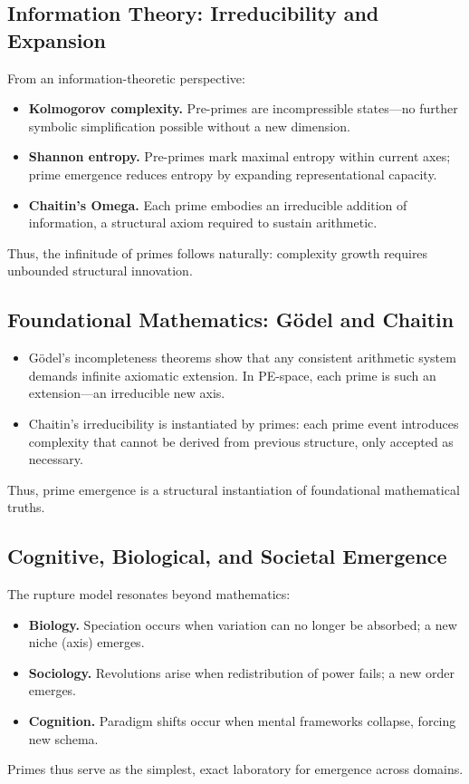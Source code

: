 \documentclass[11pt]{article}
\theoremstyle{plain}
\theoremstyle{definition}
\begin{document}
\subsection{Information Theory: Irreducibility and Expansion}
From an information-theoretic perspective:
\begin{itemize}
  \item \textbf{Kolmogorov complexity.} Pre-primes are incompressible states—no further symbolic simplification possible without a new dimension.  
  \item \textbf{Shannon entropy.} Pre-primes mark maximal entropy within current axes; prime emergence reduces entropy by expanding representational capacity.  
  \item \textbf{Chaitin’s Omega.} Each prime embodies an irreducible addition of information, a structural axiom required to sustain arithmetic.  
\end{itemize}
Thus, the infinitude of primes follows naturally: complexity growth requires unbounded structural innovation.

\subsection{Foundational Mathematics: Gödel and Chaitin}
\begin{itemize}
  \item Gödel’s incompleteness theorems show that any consistent arithmetic system demands infinite axiomatic extension. In PE-space, each prime is such an extension—an irreducible new axis.  
  \item Chaitin’s irreducibility is instantiated by primes: each prime event introduces complexity that cannot be derived from previous structure, only accepted as necessary.  
\end{itemize}
Thus, prime emergence is a structural instantiation of foundational mathematical truths.

\subsection{Cognitive, Biological, and Societal Emergence}
The rupture model resonates beyond mathematics:
\begin{itemize}
  \item \textbf{Biology.} Speciation occurs when variation can no longer be absorbed; a new niche (axis) emerges.  
  \item \textbf{Sociology.} Revolutions arise when redistribution of power fails; a new order emerges.  
  \item \textbf{Cognition.} Paradigm shifts occur when mental frameworks collapse, forcing new schema.  
\end{itemize}
Primes thus serve as the simplest, exact laboratory for emergence across domains.
\end{document}
